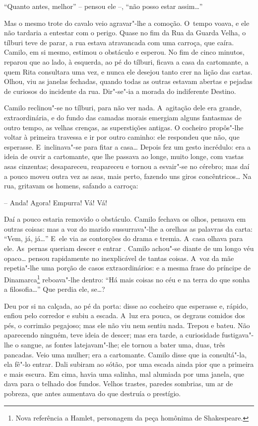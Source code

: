 ``Quanto antes, melhor'' -- pensou ele --, ``não posso estar assim\ldots{}''

Mas o mesmo trote do cavalo veio agravar"-lhe a comoção. O~tempo voava, e
ele não tardaria a entestar com o perigo. Quase no fim da Rua da Guarda
Velha, o tílburi teve de parar, a rua estava atravancada com uma
carroça, que caíra. Camilo, em si mesmo, estimou o obstáculo e esperou.
No fim de cinco minutos, reparou que ao lado, à esquerda, ao pé do
tílburi, ficava a casa da cartomante, a quem Rita consultara uma vez, e
nunca ele desejou tanto crer na lição das cartas. Olhou, viu as janelas
fechadas, quando todas as outras estavam abertas e pejadas de curiosos
do incidente da rua. Dir"-se"-ia a morada do indiferente Destino.

Camilo reclinou"-se no tílburi, para não ver nada. A~agitação dele era
grande, extraordinária, e do fundo das camadas morais emergiam alguns
fantasmas de outro tempo, as velhas crenças, as superstições antigas. O
cocheiro propôs"-lhe voltar à primeira travessa e ir por outro caminho:
ele respondeu que não, que esperasse. E~inclinava"-se para fitar a
casa\ldots{} Depois fez um gesto incrédulo: era a ideia de ouvir a
cartomante, que lhe passava ao longe, muito longe, com vastas asas
cinzentas; desapareceu, reapareceu e tornou a esvair"-se no cérebro; mas
daí a pouco moveu outra vez as asas, mais perto, fazendo uns giros
concêntricos\ldots{} Na rua, gritavam os homens, safando a carroça:

-- Anda! Agora! Empurra! Vá! Vá!

Daí a pouco estaria removido o obstáculo. Camilo fechava os olhos,
pensava em outras coisas: mas a voz do marido sussurrava"-lhe a orelhas
as palavras da carta: ``Vem, já, já\ldots{}'' E~ele via as contorções do
drama e tremia. A~casa olhava para ele. As~pernas queriam descer e
entrar . Camilo achou"-se diante de um longo véu opaco\ldots{} pensou
rapidamente no inexplicável de tantas coisas. A~voz da mãe repetia"-lhe
uma porção de casos extraordinários: e a mesma frase do príncipe de
Dinamarca\footnote{Nova referência a Hamlet, personagem da peça homônima
  de Shakespeare.} reboava"-lhe dentro: ``Há mais coisas no céu e na
terra do que sonha a filosofia\ldots{}'' Que perdia ele, se\ldots{}?

Deu por si na calçada, ao pé da porta: disse ao cocheiro que esperasse
e, rápido, enfiou pelo corredor e subiu a escada. A~luz era pouca, os
degraus comidos dos pés, o corrimão pegajoso; mas ele não viu nem sentiu
nada. Trepou e bateu. Não aparecendo ninguém, teve ideia de descer; mas
era tarde, a curiosidade fustigava"-lhe o sangue, as fontes
latejavam"-lhe; ele tornou a bater uma, duas, três pancadas. Veio uma
mulher; era a cartomante. Camilo disse que ia consultá"-la, ela fê"-lo
entrar. Dali subiram ao sótão, por uma escada ainda pior que a primeira
e mais escura. Em cima, havia uma salinha, mal alumiada por uma janela,
que dava para o telhado dos fundos. Velhos trastes, paredes sombrias, um
ar de pobreza, que antes aumentava do que destruía o prestígio.

